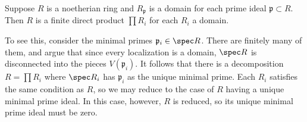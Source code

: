 \begin{exercise} 
Suppose $R$ is a noetherian ring and $R_{\mathfrak{p}}$ is a domain for each prime ideal
$\mathfrak{p} \subset R$. Then $R$ is a finite direct product $\prod R_i$ for
each $R_i$ a domain.

To see this, consider the minimal primes $\mathfrak{p}_i \in \spec R$. There
are finitely many of them, and argue that since every localization is a domain,
$\spec R$ is disconnected into the pieces $V(\mathfrak{p}_i)$.
It follows that there is a decomposition $R = \prod R_{i}$ where $\spec R_i$
has $\mathfrak{p}_i$ as the unique minimal prime. 
Each $R_i$ satisfies the same condition as $R$, so we may reduce to the case
of $R$ having a unique minimal prime ideal. In this case, however, $R$ is
reduced, so its unique minimal prime ideal must be zero.
\end{exercise} 




